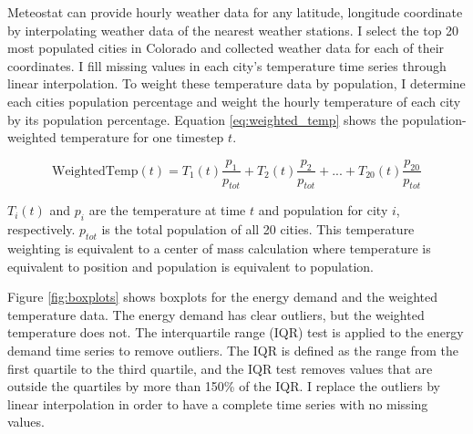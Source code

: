 \documentclass[12pt]{article}
\begin{document}
Meteostat can provide hourly weather data for any latitude, longitude coordinate by interpolating weather data of the nearest weather stations. I select the top 20 most populated cities in Colorado and collected weather data for each of their coordinates. I fill missing values in each city's temperature time series through linear interpolation. To weight these temperature data by population, I determine each cities population percentage and weight the hourly temperature of each city by its population percentage. Equation \ref{eq:weighted_temp} shows the population-weighted temperature for one timestep $t$. 

\begin{equation}
    \text{WeightedTemp}(t) = T_1(t) \frac{p_1}{p_{tot}} + T_2(t) \frac{p_2}{p_{tot}} + ... + T_{20}(t) \frac{p_{20}}{p_{tot}}
    \label{eq:weighted_temp}
\end{equation}

$T_i(t)$ and $p_i$ are the temperature at time $t$ and population for city $i$, respectively. $p_{tot}$ is the total population of all 20 cities. This temperature weighting is equivalent to a center of mass calculation where temperature is equivalent to position and population is equivalent to population.

Figure \ref{fig:boxplots} shows boxplots for the energy demand and the weighted temperature data. The energy demand has clear outliers, but the weighted temperature does not. The interquartile range (IQR) test is applied to the energy demand time series to remove outliers. The IQR is defined as the range from the first quartile to the third quartile, and the IQR test removes values that are outside the quartiles by more than 150\% of the IQR. I replace the outliers by linear interpolation in order to have a complete time series with no missing values.
\end{document}
